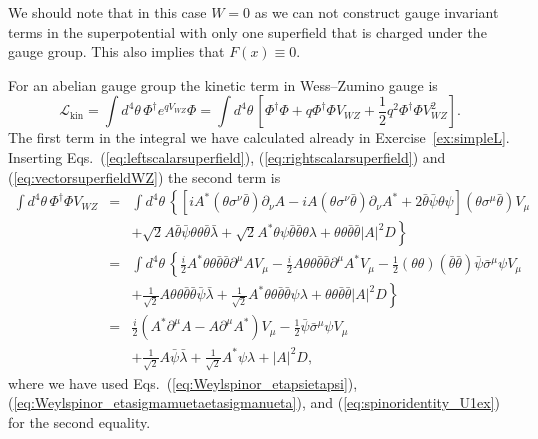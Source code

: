 \documentclass[notes.tex]{subfiles}
\begin{document}
\begin{Answer}
We should note that in this case $W=0$ as we can not construct gauge invariant terms in the superpotential with only one superfield that is charged under the gauge group. This also implies that $F(x)\equiv0$.

For an abelian gauge group the kinetic term in Wess--Zumino gauge is
\begin{equation}
\mathcal L_\text{kin} =\int d^4\theta \,\Phi^\dagger e^{qV_{WZ}}\Phi=\int d^4\theta \, \left[\Phi^\dagger \Phi+ q\Phi^\dagger \Phi V_{WZ}+\frac{1}{2} q^2\Phi^\dagger \Phi V_{WZ}^2\right].
\end{equation}
The first term in the integral we have calculated already in Exercise~\ref{ex:simpleL}.  Inserting Eqs.~(\ref{eq:leftscalarsuperfield}), (\ref{eq:rightscalarsuperfield}) and (\ref{eq:vectorsuperfieldWZ}) the second term is
\begin{eqnarray}
\int d^4\theta \, \Phi^\dagger \Phi V_{WZ} &=&
 \int d^4\theta \, \left\{ [iA^*(\theta\sigma^\nu \bar{\theta})\partial_\nu A - iA(\theta\sigma^\nu \bar{\theta})\partial_\nu A^*+  2\bar{\theta}\bar{\psi}\theta \psi] (\theta\sigma^\mu \bar{\theta})V_\mu \right.   \nonumber \\
&&\left. + \sqrt{2}A \bar{\theta}\bar\psi  \theta\theta\bar{\theta}\bar{\lambda} + \sqrt{2}A^*\theta \psi \bar{\theta}\bar{\theta}\theta\lambda  +\theta\theta\bar{\theta}\bar{\theta}|A|^2D \right\}  \nonumber \\
&=& \int d^4\theta \, \left\{ \frac{i}{2} A^* \theta\theta\bar{\theta}\bar{\theta}\partial^\mu A V_\mu- \frac{i}{2}A \theta\theta\bar{\theta}\bar{\theta}\partial^\mu A^*V_\mu -\frac{1}{2}(\theta\theta)(\bar\theta\bar\theta)\bar\psi\bar\sigma^\mu\psi V_\mu \right.  \nonumber \\
&& \left. + \frac{1}{\sqrt{2}}A\theta\theta\bar\theta\bar\theta\bar\psi\bar\lambda +  \frac{1}{\sqrt{2}} A^*\theta\theta\bar\theta\bar\theta\psi \lambda +\theta\theta\bar{\theta}\bar{\theta}|A|^2D \right\} \nonumber \\
&=&  \frac{i}{2} ( A^*\partial^\mu A- A\partial^\mu A^* )V_\mu -\frac{1}{2}\bar\psi\bar\sigma^\mu\psi V_\mu \nonumber \\
&& + \frac{1}{\sqrt{2}}A\bar\psi\bar\lambda +  \frac{1}{\sqrt{2}} A^*\psi \lambda +|A|^2D,
\end{eqnarray}
where we have used Eqs.~(\ref{eq:Weylspinor_etapsietapsi}), (\ref{eq:Weylspinor_etasigmamuetaetasigmanueta}), and (\ref{eq:spinoridentity_U1ex})
for the second equality.


\end{Answer}
\end{document}
